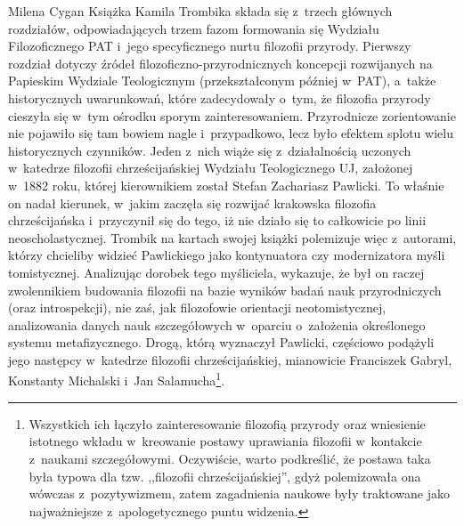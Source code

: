 \begin{newrevplenv}{Milena Cygan}
Książka Kamila Trombika składa się z~trzech głównych rozdziałów, odpowiadających trzem fazom formowania się Wydziału Filozoficznego PAT i~jego specyficznego nurtu filozofii przyrody. Pierwszy rozdział dotyczy źródeł filozoficzno-przyrodnicznych koncepcji rozwijanych na Papieskim Wydziale Teologicznym (przekształconym później w~PAT), a~także historycznych uwarunkowań, które zadecydowały o~tym, że filozofia przyrody cieszyła się w~tym ośrodku sporym zainteresowaniem. Przyrodnicze zorientowanie nie pojawiło się tam bowiem nagle i~przypadkowo, lecz było efektem splotu wielu historycznych czynników. Jeden z~nich wiąże się z~działalnością uczonych w~katedrze filozofii chrześcijańskiej Wydziału Teologicznego UJ, założonej w~1882 roku, której kierownikiem został Stefan Zachariasz Pawlicki. To właśnie on nadał kierunek, w~jakim zaczęła się rozwijać krakowska filozofia chrześcijańska i~przyczynił się do tego, iż nie działo się to całkowicie po linii neoscholastycznej. Trombik na kartach swojej książki polemizuje więc z~autorami, którzy chcieliby widzieć Pawlickiego jako kontynuatora czy modernizatora myśli tomistycznej. Analizując dorobek tego myśliciela, wykazuje, że był on raczej zwolennikiem budowania filozofii na bazie wyników badań nauk przyrodniczych (oraz introspekcji), nie zaś, jak filozofowie orientacji neotomistycznej, analizowania danych nauk szczegółowych w~oparciu o~założenia określonego systemu metafizycznego. Drogą, którą wyznaczył Pawlicki, częściowo podążyli jego następcy w~katedrze filozofii chrześcijańskiej, mianowicie Franciszek Gabryl, Konstanty Michalski i~Jan Salamucha\footnote{Wszystkich ich łączyło zainteresowanie filozofią przyrody oraz wniesienie istotnego wkładu w~kreowanie postawy uprawiania filozofii w~kontakcie z~naukami szczegółowymi. Oczywiście, warto podkreślić, że postawa taka była typowa dla tzw. ,,filozofii chrześcijańskiej'', gdyż polemizowała ona wówczas z~pozytywizmem, zatem zagadnienia naukowe były traktowane jako najważniejsze z~apologetycznego puntu widzenia.}.


\end{newrevplenv}
